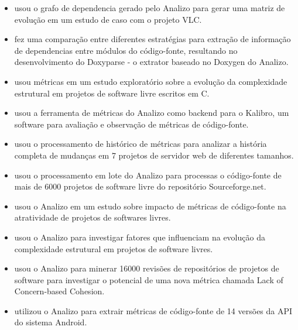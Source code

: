 \documentclass{article}
\begin{document}
\begin{itemize}

\item \cite{Amaral2009} usou o grafo de dependencia gerado pelo Analizo para
gerar uma matriz de evolução em um estudo de caso com o projeto VLC.

\item \cite{Costa2009} fez uma comparação entre diferentes estratégias para
extração de informação de dependencias entre módulos do código-fonte,
resultando no desenvolvimento do Doxyparse - o extrator baseado no Doxygen do
Analizo.

\item \cite{Terceiro2009} usou métricas em um estudo exploratório sobre a
evolução da complexidade estrutural em projetos de software livre escritos em
C.

\item \cite{Morais2009} usou a ferramenta de métricas do Analizo como backend
para o Kalibro, um software para avaliação e observação de métricas de código-fonte.

\item \cite{Terceiro2010} usou o processamento de histórico de métricas para
analizar a história completa de mudanças em 7 projetos de servidor web de
diferentes tamanhos.

\item \cite{Meirelles2010} usou o processamento em lote do Analizo para
processas o código-fonte de mais de 6000 projetos de software livre do
repositório Sourceforge.net.

\item \cite{Meirelles2011} usou o Analizo em um estudo sobre impacto de
métricas de código-fonte na atratividade de projetos de softwares livres.

\item \cite{Terceiro2012Understanding} usou o Analizo para investigar fatores
que influenciam na evolução da complexidade estrutural em projetos de software
livres.

\item \cite{Silva2012} usou o Analizo para minerar 16000 revisões de
repositórios de projetos de software para investigar o potencial de uma nova
métrica chamada Lack of Concern-based Cohesion.

\item \cite{Ronaldo2015} utilizou o Analizo para extrair métricas de
código-fonte de 14 versões da API do sistema Android.

\end{itemize}
\end{document}
